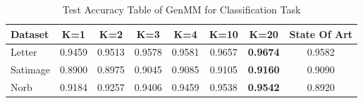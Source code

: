 \begin{table}
  \caption{Test Accuracy Table of GenMM for Classification Task}\label{tab:acc-classification}
  \begin{tabular}{l|c|c|c|c|c|c|c} \toprule
    {Dataset} &  K=1 &  K=2 &  K=3 &  K=4 & K=10 & K=20 & State Of Art \\ \midrule
    Letter & 0.9459 &  0.9513 & 0.9578  & 0.9581 & 0.9657 & \textbf{0.9674} & {0.9582} \cite{tang2016extreme} \\ \midrule
    Satimage & 0.8900 & 0.8975 & 0.9045 & 0.9085 & 0.9105 & \textbf{0.9160} & 0.9090 \cite{jiang2013k-svd}   \\ \midrule
    Norb & 0.9184 & 0.9257 & 0.9406 & 0.9459 & 0.9538 & \textbf{0.9542} & 0.8920 \cite{pmlr-v5-salakhutdinov09a}  \\
  \end{tabular}
\end{table}
